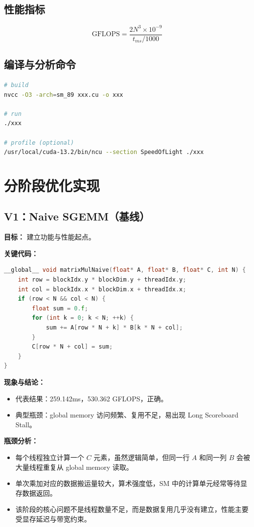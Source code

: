 \documentclass[12pt,a4paper]{ctexart}
\begin{document}
\subsection{性能指标}
\[
\mathrm{GFLOPS} = \frac{2N^3 \times 10^{-9}}{t_{ms}/1000}
\]

\subsection{编译与分析命令}
\begin{lstlisting}[language=bash]
# build
nvcc -O3 -arch=sm_89 xxx.cu -o xxx

# run
./xxx

# profile (optional)
/usr/local/cuda-13.2/bin/ncu --section SpeedOfLight ./xxx
\end{lstlisting}

\section{分阶段优化实现}

\subsection{V1：Naive SGEMM（基线）}
\textbf{目标：} 建立功能与性能起点。

\textbf{关键代码：}
\begin{lstlisting}[language=C++]
__global__ void matrixMulNaive(float* A, float* B, float* C, int N) {
    int row = blockIdx.y * blockDim.y + threadIdx.y;
    int col = blockIdx.x * blockDim.x + threadIdx.x;
    if (row < N && col < N) {
        float sum = 0.f;
        for (int k = 0; k < N; ++k) {
            sum += A[row * N + k] * B[k * N + col];
        }
        C[row * N + col] = sum;
    }
}
\end{lstlisting}

\textbf{现象与结论：}
\begin{itemize}[leftmargin=2em]
  \item 代表结果：259.142ms，530.362 GFLOPS，正确。
  \item 典型瓶颈：global memory 访问频繁、复用不足，易出现 Long Scoreboard Stall。
\end{itemize}

\textbf{瓶颈分析：}
\begin{itemize}[leftmargin=2em]
  \item 每个线程独立计算一个 \(C\) 元素，虽然逻辑简单，但同一行 \(A\) 和同一列 \(B\) 会被大量线程重复从 global memory 读取。
  \item 单次乘加对应的数据搬运量较大，算术强度低，SM 中的计算单元经常等待显存数据返回。
  \item 该阶段的核心问题不是线程数量不足，而是数据复用几乎没有建立，性能主要受显存延迟与带宽约束。
\end{itemize}
\end{document}
